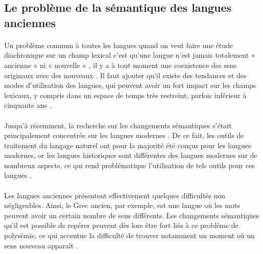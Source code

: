 \documentclass{article}
\begin{document}
\subsection{Le problème de la sémantique des langues anciennes}
\paragraph{}
Un problème commun à toutes les langues quand on veut faire une étude diachronique sur un champ lexical c’est qu’une langue n’est jamais totalement « ancienne » ni « nouvelle » \cite[p. 4]{liebeskind2020deep}, il y a à tout moment une coexistence des sens originaux avec des nouveaux \cite[p. 1]{perrone2019gasc}. Il faut ajouter qu’il existe des tendances et des modes d’utilisation des langues, qui peuvent avoir un fort impact sur les champs lexicaux, y compris dans un espace de temps très restreint, parfois inférieur à cinquante ans \cite[p. 4]{liebeskind2020deep}. 
\paragraph{}
Jusqu’à récemment, la recherche sur les changements sémantiques s’était principalement concentrée sur les langues modernes \cite[p. 1]{perrone2021lexical}. De ce fait, les outils de traitement du langage naturel ont pour la majorité été conçus pour les langues modernes, or les langues historiques sont différentes des langues modernes sur de nombreux aspects, ce qui rend problématique l’utilisation de tels outils pour ces langues \cite[p. 2]{di2021latin}.
\paragraph{}
Les langues anciennes présentent effectivement quelques difficultés non négligeables. Ainsi, le Grec ancien, par exemple, est une langue où les mots peuvent avoir un certain nombre de sens différents. Les changements sémantiques qu’il est possible de repérer peuvent dès lors être fort liés à ce problème de polysémie, ce qui accentue la difficulté de trouver notamment un moment où un sens nouveau apparaît \cite[pp. 2-4]{perrone2019gasc}. 
\end{document}
